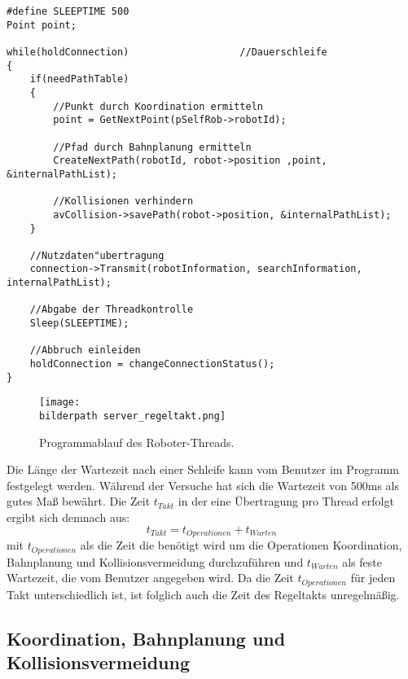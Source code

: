 \begin{lstlisting}[frame=tb,captionpos=b,caption=Thread des Regeltaktes., label=serv:lst:thread]
#define SLEEPTIME 500
Point point;

while(holdConnection) 					//Dauerschleife
{	
	if(needPathTable)
	{
		//Punkt durch Koordination ermitteln
		point = GetNextPoint(pSelfRob->robotId);
		
		//Pfad durch Bahnplanung ermitteln
		CreateNextPath(robotId, robot->position ,point, &internalPathList);
		
		//Kollisionen verhindern
		avCollision->savePath(robot->position, &internalPathList);
	} 	
	
	//Nutzdaten"ubertragung
	connection->Transmit(robotInformation, searchInformation, internalPathList);
	
	//Abgabe der Threadkontrolle
	Sleep(SLEEPTIME);
	
	//Abbruch einleiden
	holdConnection = changeConnectionStatus();
}

\end{lstlisting}


\begin{figure}[h]
	\centering	
	\texttt{[image: \\bilderpath server\_regeltakt.png]}
	\caption{Programmablauf des Roboter-Threads.}
\end{figure}

Die Länge der Wartezeit nach einer Schleife kann vom Benutzer im Programm festgelegt werden. Während der Versuche hat sich die Wartezeit von 500ms als gutes Maß bewährt. Die Zeit $t_{Takt}$ in der eine Übertragung pro Thread erfolgt ergibt sich demnach aus: 
\begin{equation}
t_{Takt} = t_{Operationen}+t_{Warten}
\end{equation}
mit $t_{Operationen}$ als die Zeit die benötigt wird um die Operationen Koordination, Bahnplanung und Kollisionsvermeidung durchzuführen und $t_{Warten}$ als feste Wartezeit, die vom Benutzer angegeben wird. Da die Zeit $t_{Operationen}$ für jeden Takt unterschiedlich ist, ist folglich auch die Zeit des Regeltakts unregelmäßig. 

\subsection{Koordination, Bahnplanung und Kollisionsvermeidung}\label{serv:kbk}

